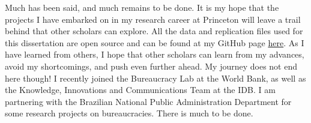 Much has been said, and much remains to be done. It is my hope that the projects I have embarked on in my research career at Princeton will leave a trail behind that other scholars can explore. All the data and replication files used for this dissertation are open source and can be found at my GitHub page \href{https://github.com/galileukim}{here}. As I have learned from others, I hope that other scholars can learn from my advances, avoid my shortcomings, and push even further ahead. My journey does not end here though! I recently joined the Bureaucracy Lab at the World Bank, as well as the Knowledge, Innovations and Communications Team at the IDB. I am partnering with the Brazilian National Public Administration Department for some research projects on bureaucracies. There is much to be done.

\newpage